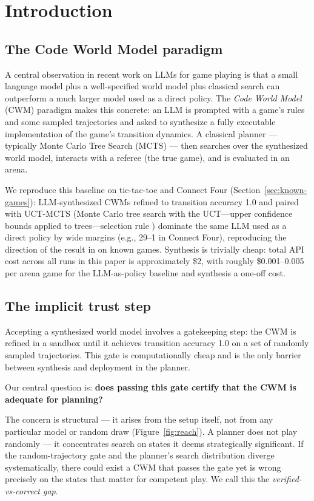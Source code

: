 \documentclass[11pt]{article}
\theoremstyle{remark}
\begin{document}
\section{Introduction}

\subsection{The Code World Model paradigm}

A central observation in recent work on LLMs for game playing is that a small language model plus a well-specified world model plus classical search can outperform a much larger model used as a direct policy. The \emph{Code World Model} (CWM) paradigm makes this concrete: an LLM is prompted with a game's rules and some sampled trajectories and asked to synthesize a fully executable implementation of the game's transition dynamics. A classical planner --- typically Monte Carlo Tree Search (MCTS) \citep{coulom2006mcts} --- then searches over the synthesized world model, interacts with a referee (the true game), and is evaluated in an arena.

We reproduce this baseline on tic-tac-toe and Connect Four (Section~\ref{sec:known-games}): LLM-synthesized CWMs refined to transition accuracy 1.0 and paired with UCT-MCTS (Monte Carlo tree search with the UCT---upper confidence bounds applied to trees---selection rule \citep{kocsis2006bandit}) dominate the same LLM used as a direct policy by wide margins (e.g., 29--1 in Connect Four), reproducing the direction of the result in \citet{lehrach2025cwm} on known games. Synthesis is trivially cheap: total API cost across all runs in this paper is approximately \$2, with roughly \$0.001--0.005 per arena game for the LLM-as-policy baseline and synthesis a one-off cost.

\subsection{The implicit trust step}

Accepting a synthesized world model involves a gatekeeping step: the CWM is refined in a sandbox until it achieves transition accuracy 1.0 on a set of randomly sampled trajectories. This gate is computationally cheap and is the only barrier between synthesis and deployment in the planner.

Our central question is: \textbf{does passing this gate certify that the CWM is adequate for planning?}

The concern is structural --- it arises from the setup itself, not from any particular model or random draw (Figure~\ref{fig:reach}). A planner does not play randomly --- it concentrates search on states it deems strategically significant. If the random-trajectory gate and the planner's search distribution diverge systematically, there could exist a CWM that passes the gate yet is wrong precisely on the states that matter for competent play. We call this the \emph{verified-vs-correct gap}.
\end{document}
